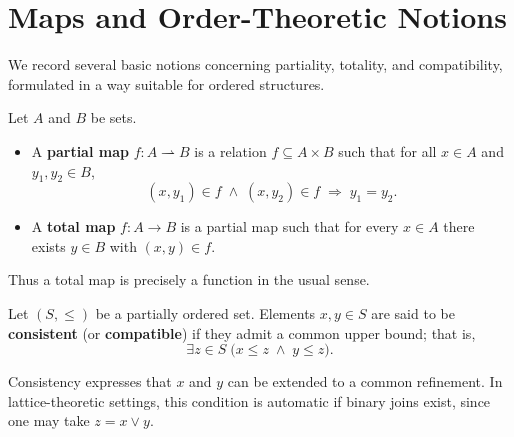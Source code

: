 
\section{Maps and Order-Theoretic Notions}

We record several basic notions concerning partiality, totality, and compatibility, formulated in a way suitable for ordered structures.


\begin{definition}
Let $A$ and $B$ be sets.
\begin{itemize}
    \item A \textbf{partial map} $f : A \rightharpoonup B$ is a relation $f \subseteq A \times B$ such that for all $x \in A$ and $y_1,y_2 \in B$,
    \[
    (x,y_1) \in f \;\land\; (x,y_2) \in f \;\Longrightarrow\; y_1 = y_2.
    \]
    \item A \textbf{total map} $f : A \to B$ is a partial map such that for every $x \in A$ there exists $y \in B$ with $(x,y) \in f$.
\end{itemize}
Thus a total map is precisely a function in the usual sense.
\end{definition}


\begin{definition}
Let $(S,\le)$ be a partially ordered set. Elements $x,y \in S$ are said to be \textbf{consistent} (or \textbf{compatible}) if they admit a common upper bound; that is,
\[
\exists z \in S \;\bigl(x \le z \;\land\; y \le z\bigr).
\]
\end{definition}

\begin{remark}
Consistency expresses that $x$ and $y$ can be extended to a common refinement. In lattice-theoretic settings, this condition is automatic if binary joins exist, since one may take $z = x \vee y$.
\end{remark}

